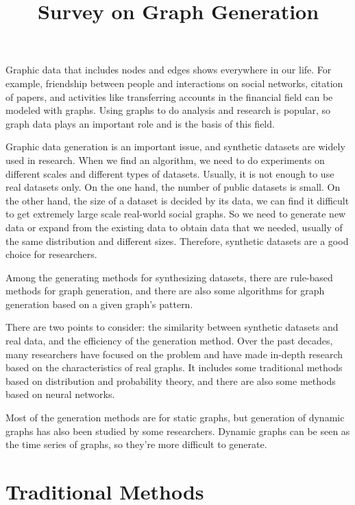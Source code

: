 
\begin{survey}
\label{cha:survey}

\title{Survey on Graph Generation}
\maketitle

Graphic data that includes nodes and edges shows everywhere in our life.
For example, friendship between people and interactions on social
networks, citation of papers, and activities like transferring accounts
in the financial field can be modeled with graphs. Using graphs to do
analysis and research is popular, so graph data plays an important role
and is the basis of this field.

Graphic data generation is an important issue, and synthetic datasets
are widely used in research. When we find an algorithm, we need to do
experiments on different scales and different types of datasets.
Usually, it is not enough to use real datasets only. On the one hand,
the number of public datasets is small. On the other hand, the size of a
dataset is decided by its data, we can find it difficult to get
extremely large scale real-world social graphs. So we need to generate
new data or expand from the existing data to obtain data that we needed,
usually of the same distribution and different sizes. Therefore,
synthetic datasets are a good choice for researchers.

Among the generating methods for synthesizing datasets, there are
rule-based methods for graph generation, and there are also some
algorithms for graph generation based on a given graph's pattern.

There are two points to consider: the similarity between synthetic
datasets and real data, and the efficiency of the generation method.
Over the past decades, many researchers have focused on the problem and
have made in-depth research based on the characteristics of real graphs.
It includes some traditional methods based on distribution and
probability theory, and there are also some methods based on neural
networks.

Most of the generation methods are for static graphs, but generation of
dynamic graphs has also been studied by some researchers. Dynamic graphs
can be seen as the time series of graphs, so they're more difficult to
generate.

\section{Traditional Methods}


\end{survey}
